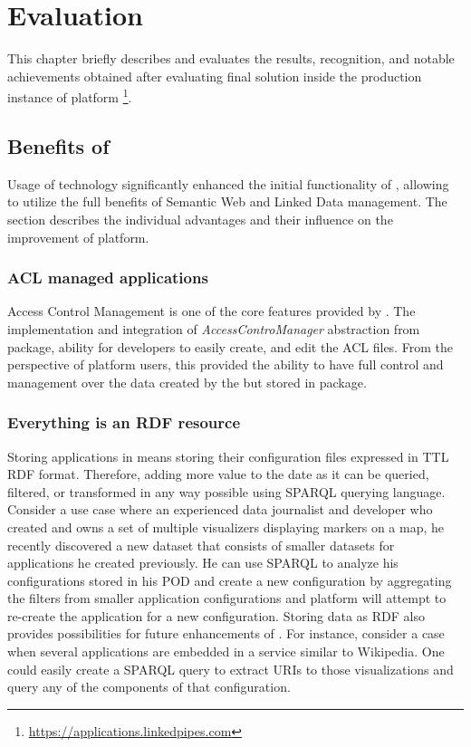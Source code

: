 \chapter{Evaluation}
\label{chap:num_6}

This chapter briefly describes and evaluates the results, recognition, and notable achievements obtained after evaluating final \lpas{} solution inside the production instance of \lpa{} platform \footnote{\url{https://applications.linkedpipes.com}}.

\section{Benefits of \solid{}}

Usage of \solid{} technology significantly enhanced the initial functionality of \lpa{}, allowing to utilize the full benefits of Semantic Web and Linked Data management. The section describes the individual advantages and their influence on the improvement of \lpa{} platform.

\subsection{ACL managed applications}

Access Control Management is one of the core features provided by \solid{}. The implementation and integration of \textit{AccessControManager} abstraction from \lpas{} package, ability for \lpa{} developers to easily create, and edit the ACL files. From the perspective of \lpa{} platform users, this provided the ability to have full control and management over the data created by the \lpa{} but stored in \lpas{} package. 

\subsection{Everything is an RDF resource}

Storing \lpa{} applications in \solid{} means storing their configuration files expressed in TTL RDF format. Therefore, adding more value to the date as it can be queried, filtered, or transformed in any way possible using SPARQL querying language. Consider a use case where an experienced data journalist and developer who created and owns a set of multiple visualizers displaying markers on a map, he recently discovered a new dataset that consists of smaller datasets for applications he created previously. He can use SPARQL to analyze his configurations stored in his \solid{} POD and create a new configuration by aggregating the filters from smaller application configurations and \lpa{} platform will attempt to re-create the application for a new configuration.
Storing data as RDF also provides possibilities for future enhancements of \lpas{}. For instance, consider a case when several \lpa{} applications are embedded in a service similar to Wikipedia. One could easily create a SPARQL query to extract URIs to those visualizations and query any of the components of that configuration. 

